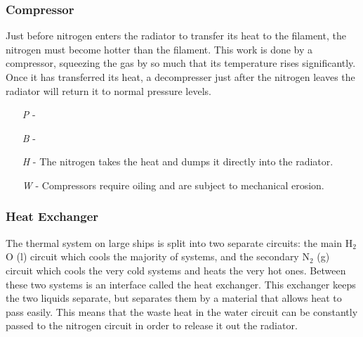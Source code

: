 \documentclass[a4paper]{article}
\begin{document}
\vspace{-0.5cm} \hspace{-18pt} \subsubsection{Compressor} \label{thermal_compressor} \vspace{-0.2cm}
Just before nitrogen enters the radiator to transfer its heat to the filament, the nitrogen must become hotter than the filament. This work is done by a compressor, squeezing the gas by so much that its temperature rises significantly. Once it has transferred its heat, a decompresser just after the nitrogen leaves the radiator will return it to normal pressure levels.
\begin{enumerate}
\item [\textit{P}] -  \\
\item [\textit{B}] -  \\
\item [\textit{H}] - The nitrogen takes the heat and dumps it directly into the radiator.
\item [\textit{W}] - Compressors require oiling and are subject to mechanical erosion.
\end{enumerate}

\vspace{-0.5cm} \hspace{-18pt} \subsubsection{Heat Exchanger} \label{thermal_exchanger} \vspace{-0.2cm}
The thermal system on large ships is split into two separate circuits: the main H$_2$O (l) circuit which cools the majority of systems, and the secondary N$_2$ (g) circuit which cools the very cold systems and heats the very hot ones. Between these two systems is an interface called the heat exchanger. This exchanger keeps the two liquids separate, but separates them by a material that allows heat to pass easily. This means that the waste heat in the water circuit can be constantly passed to the nitrogen circuit in order to release it out the radiator.
\end{document}
